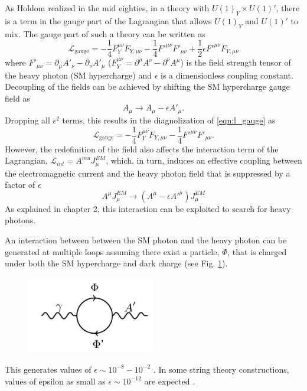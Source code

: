 As Holdom \cite{holdom1986} realized in the mid eighties, in a theory with 
$U(1)_Y \times U(1)'$, there is a term in the gauge part of the Lagrangian 
that allows $U(1)_Y$ and $U(1)'$ to mix.  The gauge part of such a theory can
be written as
\begin{equation}
    \mathcal{L}_{\text{gauge}} = - \frac{1}{4} F_Y^{\mu \nu}F_{Y, \mu \nu}
                          - \frac{1}{4} F'^{\mu \nu}F'_{\mu \nu}
                          + \frac{1}{2} \epsilon F'^{\mu \nu} F_{Y, \mu \nu}
    \label{eqn:l_gauge}
\end{equation}
where $F'_{\mu \nu} = \partial_{\mu}A'_{\nu} - \partial_{\nu}A'_{\mu}$ 
($F^{\mu \nu}_{Y} = \partial^{\mu}A^{\nu} - \partial^{\nu}A^{\mu}$) is the
field strength tensor of the heavy photon (SM hypercharge) and $\epsilon$ is a
dimensionless coupling constant.  Decoupling of the fields can be achieved by 
shifting the SM hypercharge gauge field as 
\begin{equation}
    A_{\mu} \rightarrow A_{\mu} - \epsilon A'_{\mu}.
\end{equation}
Dropping all $\epsilon^2$ terms, this results in the diagnolization of \ref{eqn:l_gauge} as
\begin{equation}
    \mathcal{L}_{\text{gauge}} = - \frac{1}{4} F_Y^{\mu \nu}F_{Y, \mu \nu}
                          - \frac{1}{4} F'^{\mu \nu}F'_{\mu \nu}.
\end{equation}
However, the redefinition of the field also affects the interaction term of 
the Lagrangian, $\mathcal{L}_{int} = A^{mu}J_{\mu}^{EM}$, which, in turn, induces
an effective coupling between the electromagnetic current and the heavy photon
field that is suppressed by a factor of $\epsilon$
\begin{equation}
    A^{\mu}J_{\mu}^{EM} \rightarrow (A^{\mu} - \epsilon A'^{\mu})J_{\mu}^{EM}
\end{equation}
As explained in chapter 2, this interaction can be exploited to search for heavy 
photons.

An interaction between between the SM photon and the heavy photon can be 
generated at multiple loops assuming there exist a particle, $\Phi$, that is charged
under both the SM hypercharge and dark charge (see Fig. \ref{fig:ap_loop}).
\begin{figure}
    \centering
    \includegraphics[width=0.5\textwidth]{images/aprime_loop.png}
    \label{fig:ap_loop}
\end{figure}
This generates values of $\epsilon \sim 10^{-8} - 10^{-2}$ 
\cite{arkani-hamed2008, bjorken2009}.  In some string theory constructions, 
values of epsilon as small as $\epsilon \sim 10^{-12}$ are expected \cite{}.

